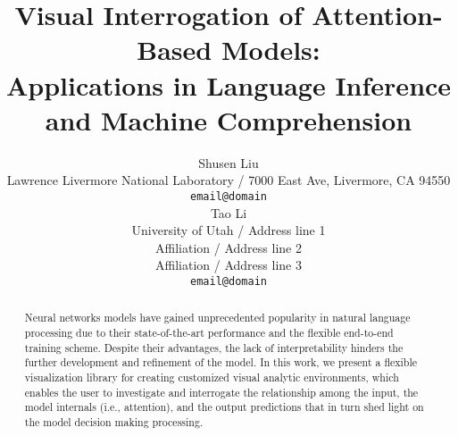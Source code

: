 \documentclass[11pt,a4paper]{article}
\title{Visual Interrogation of Attention-Based Models: \\ Applications in Language Inference and Machine Comprehension}
\author{Shusen Liu \\
  Lawrence Livermore National Laboratory  / 7000 East Ave, Livermore, CA 94550 \\
  {\tt email@domain} \\\And
  Tao Li \\
  University of Utah / Address line 1 \\
  Affiliation / Address line 2 \\
  Affiliation / Address line 3 \\
  {\tt email@domain} \\}
\date{}
\begin{document}
\maketitle

\begin{abstract}
Neural networks models have gained unprecedented popularity in natural language processing due to their state-of-the-art performance and the flexible end-to-end training scheme. Despite their advantages, the lack of interpretability hinders the further development and refinement of the model.
%
In this work, we present a flexible visualization library for creating customized visual analytic environments, which enables the user to investigate and interrogate the relationship among the input, the model internals (i.e., attention), and the output predictions that in turn shed light on the model decision making processing.
 
\end{abstract}









\end{document}
